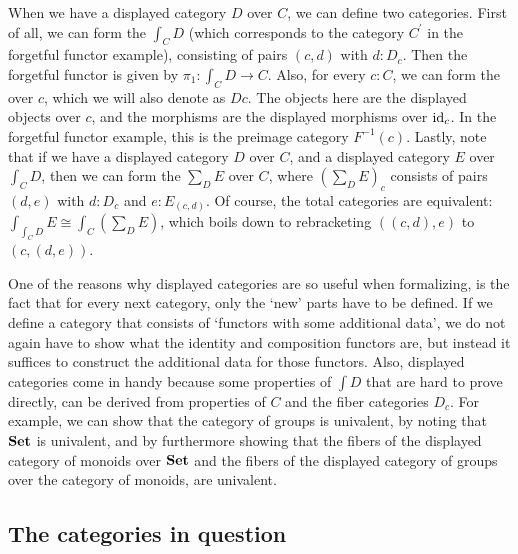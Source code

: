 When we have a displayed category $ D $ over $ C $, we can define two categories. First of all, we can form the  $ \int_C D $ (which corresponds to the category $ C^\prime $ in the forgetful functor example), consisting of pairs $ (c, d) $ with $ d : D_c $. Then the forgetful functor is given by $ \pi_1 : \int_C D \to C $. Also, for every $ c : C $, we can form the  over $ c $, which we will also denote as $ D c $. The objects here are the displayed objects over $ c $, and the morphisms are the displayed morphisms over $ \text{id}_{c} $. In the forgetful functor example, this is the preimage category $ F^{-1}(c) $. Lastly, note that if we have a displayed category $ D $ over $ C $, and a displayed category $ E $ over $ \int_C D $, then we can form the  $ \sum_D E $ over $ C $, where $ (\sum_D E)_c $ consists of pairs $ (d, e) $ with $ d : D_c $ and $ e : E_{(c, d)} $. Of course, the total categories are equivalent: $ \int_{\int_C D} E \cong \int_C (\sum_D E) $, which boils down to rebracketing $ ((c, d), e) $ to $ (c, (d, e)) $.

One of the reasons why displayed categories are so useful when formalizing, is the fact that for every next category, only the `new' parts have to be defined. If we define a category that consists of `functors with some additional data', we do not again have to show what the identity and composition functors are, but instead it suffices to construct the additional data for those functors. Also, displayed categories come in handy because some properties of $ \int D $ that are hard to prove directly, can be derived from properties of $ C $ and the fiber categories $ D_c $. For example, we can show that the category of groups is univalent, by noting that $ \mathbf{Set} $ is univalent, and by furthermore showing that the fibers of the displayed category of monoids over $ \mathbf{Set} $ and the fibers of the displayed category of groups over the category of monoids, are univalent.

\subsection{The categories in question}\label{subsec:formalized-categories}

